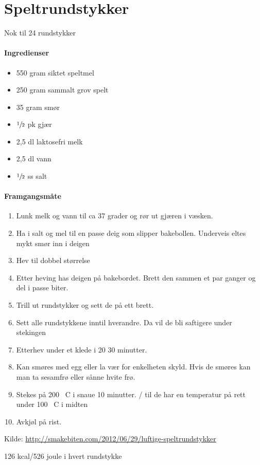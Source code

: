 \section{Speltrundstykker}
Nok til 24 rundstykker

\paragraph{Ingredienser}
\begin{itemize}[noitemsep]
	\item 550 gram siktet speltmel
	\item 250 gram sammalt grov spelt
	\item 35 gram smør
	\item  $\sfrac{1}{2}$  pk gjær
	\item 2,5 dl laktosefri melk
	\item 2,5 dl vann
	\item  $\sfrac{1}{2}$  ss salt
\end{itemize}


\paragraph{Framgangsmåte}
\begin{enumerate}[noitemsep]
	\item Lunk melk og vann til ca 37 grader og rør ut gjæren i væsken.
	\item Ha i salt og mel til en passe deig som slipper bakebollen. Underveis eltes mykt smør inn i deigen
	\item Hev til dobbel størrelse
	\item Etter heving has deigen på bakebordet. Brett den sammen et par ganger og del i passe biter.
	\item Trill ut rundstykker og sett de på ett brett.
	\item Sett alle rundstykkene inntil hverandre. Da vil de bli saftigere under stekingen
	\item Etterhev under et klede i 20 30 minutter.
	\item Kan smøres med egg eller la vær for enkelheten skyld. Hvis de smøres kan man ta sesamfrø eller sånne hvite frø.
	\item Stekes på 200 \degree~C i snaue 10 minutter. / til de har en temperatur på rett under 100 \degree~C i midten
	\item Avkjøl på rist.
\end{enumerate}

Kilde: \url{http://smakebiten.com/2012/06/29/luftige-speltrundstykker}


126 kcal/526 joule i hvert rundstykke
